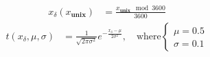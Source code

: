 \begin{align*}
    x_\delta(x_{\textbf{unix}}) &= \frac{x_\textbf{unix}\mod 3600}{3600}
\end{align*}
\begin{align*}
    t(x_\delta, \mu, \sigma) &= \frac{1}{\sqrt{2\pi\sigma^2}} e^{-\frac{x_\delta-\mu}{2\sigma^2}}, \quad \text{where}
    \begin{cases}
    \mu = 0.5 \\
    \sigma = 0.1 
    \end{cases}
\end{align*}
